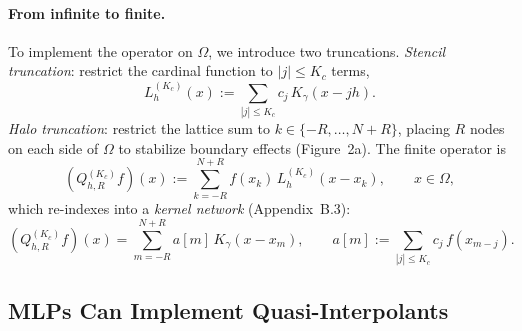 \documentclass{article}
\begin{document}
\paragraph{From infinite to finite.}
To implement the operator on \(\Omega\), we introduce two truncations. \emph{Stencil truncation}: restrict the cardinal function to \(|j| \leq K_c\) terms,
\begin{equation}
L_h^{(K_c)}(x) := \sum_{|j| \leq K_c} c_j\, K_\gamma(x - jh).
\label{eq:Lh-trunc}
\end{equation}
\emph{Halo truncation}: restrict the lattice sum to \(k \in \{-R, \ldots, N+R\}\), placing \(R\) nodes on each side of \(\Omega\) to stabilize boundary effects (Figure~2a). The finite operator is
\begin{equation}
(Q_{h,R}^{(K_c)} f)(x) := \sum_{k=-R}^{N+R} f(x_k)\, L_h^{(K_c)}(x - x_k),
\qquad x \in \Omega,
\label{eq:finite-op}
\end{equation}
which re-indexes into a \emph{kernel network} (Appendix~B.3):
\begin{equation}
(Q_{h,R}^{(K_c)} f)(x)
=
\sum_{m=-R}^{N+R} a[m]\, K_\gamma(x - x_m),
\qquad
a[m] := \sum_{|j| \leq K_c} c_j\, f(x_{m-j}).
\label{eq:kernel-network}
\end{equation}

\subsection{MLPs Can Implement Quasi-Interpolants}
\label{subsec:mlp-implementation}
\end{document}
